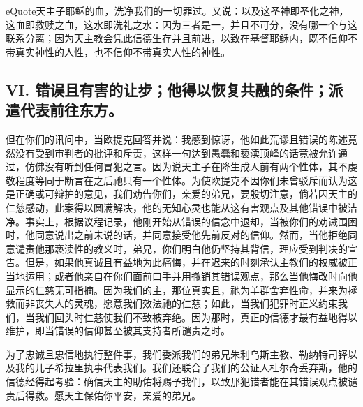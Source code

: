 eQuote{天主子耶稣的血，洗净我们的一切罪过。}又说：以及这圣神即圣化之神，这血即救赎之血，这水即洗礼之水：因为三者是一，并且不可分，没有哪一个与这联系分离；因为天主教会凭此信德生存并且前进，以致在基督耶稣内，既不信仰不带真实神性的人性，也不信仰不带真实人性的神性。\par


\subsection{VI. 错误且有害的让步；他得以恢复共融的条件；派遣代表前往东方。}

但在你们的讯问中，当欧提克回答并说：我感到惊讶，他如此荒谬且错误的陈述竟然没有受到审判者的批评和斥责，这样一句达到愚蠢和亵渎顶峰的话竟被允许通过，仿佛没有听到任何冒犯之言。因为说天主子在降生成人前有两个性体，其不虔敬程度等同于断言在之后祂只有一个性体。为使欧提克不因你们未曾驳斥而认为这是正确或可辩护的意见，我们劝告你们，亲爱的弟兄，要殷切注意，倘若因天主的仁慈感动，此案得以圆满解决，他的无知心灵也能从这有害观点及其他错误中被洁净。事实上，根据议程记录，他刚开始从错误的信念中退却，当被你们的劝诫围困时，他同意说出之前未说的话，并同意接受他先前反对的信仰。然而，当他拒绝同意谴责他那亵渎性的教义时，弟兄，你们明白他仍坚持其背信，理应受到判决的宣告。但是，如果他真诚且有益地为此痛悔，并在迟来的时刻承认主教们的权威被正当地运用；或者他亲自在你们面前口手并用撤销其错误观点，那么当他悔改时向他显示的仁慈无可指摘。因为我们的主，那位真实且，祂为羊群舍弃性命，并来为拯救而非丧失人的灵魂，愿意我们效法祂的仁慈；如此，当我们犯罪时正义约束我们，当我们回头时仁慈使我们不致被弃绝。因为那时，真正的信德才最有益地得以维护，即当错误的信仰甚至被其支持者所谴责之时。\par

为了忠诚且忠信地执行整件事，我们委派我们的弟兄朱利乌斯主教、勒纳特司铎以及我的儿子希拉里执事代表我们。我们还联合了我们的公证人杜尔奇丢弃斯，他的信德经得起考验：确信天主的助佑将赐予我们，以致那犯错者能在其错误观点被谴责后得救。愿天主保佑你平安，亲爱的弟兄。\par

